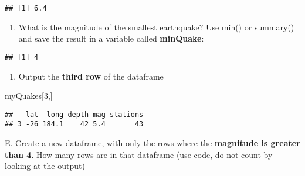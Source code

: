 \documentclass[
]{article}
\newenvironment{Shaded}{\begin{snugshade}}{\end{snugshade}}
\newcommand{\DecValTok}[1]{\textcolor[rgb]{0.00,0.00,0.81}{#1}}
\newcommand{\FunctionTok}[1]{\textcolor[rgb]{0.13,0.29,0.53}{\textbf{#1}}}
\newcommand{\NormalTok}[1]{#1}
\newcommand{\OtherTok}[1]{\textcolor[rgb]{0.56,0.35,0.01}{#1}}
\newcommand{\SpecialCharTok}[1]{\textcolor[rgb]{0.81,0.36,0.00}{\textbf{#1}}}
\providecommand{\tightlist}{%
  \setlength{\itemsep}{0pt}\setlength{\parskip}{0pt}}
\begin{document}
\begin{verbatim}
## [1] 6.4
\end{verbatim}

\begin{enumerate}
\def\labelenumi{\Alph{enumi}.}
\setcounter{enumi}{2}
\tightlist
\item
  What is the magnitude of the smallest earthquake? Use min() or
  summary() and save the result in a variable called \textbf{minQuake}:
\end{enumerate}

\begin{Shaded}
\end{Shaded}

\begin{verbatim}
## [1] 4
\end{verbatim}

\begin{enumerate}
\def\labelenumi{\Alph{enumi}.}
\setcounter{enumi}{3}
\tightlist
\item
  Output the \textbf{third row} of the dataframe
\end{enumerate}

\begin{Shaded}
\begin{Highlighting}[]
\NormalTok{myQuakes[}\DecValTok{3}\NormalTok{,]}
\end{Highlighting}
\end{Shaded}

\begin{verbatim}
##   lat  long depth mag stations
## 3 -26 184.1    42 5.4       43
\end{verbatim}

E. Create a new dataframe, with only the rows where the
\textbf{magnitude is greater than 4}. How many rows are in that
dataframe (use code, do not count by looking at the output)

\begin{Shaded}
\end{Shaded}
\end{document}
